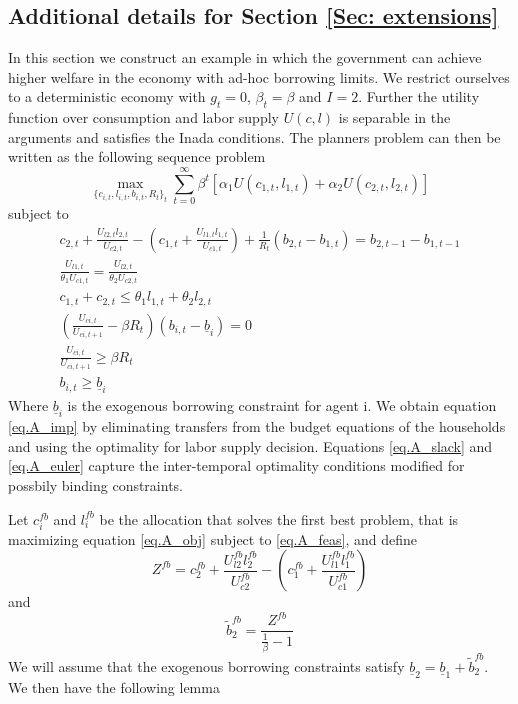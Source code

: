 \documentclass[thmsb,11pt]{article}
\begin{document}
\subsection{Additional details for Section \ref{Sec: extensions}}
\label{appndx: borrowing constraints example}
In this section we construct an example in which the government can achieve
higher welfare in the economy with ad-hoc borrowing limits. We restrict ourselves to a deterministic economy with $g_t=0$, $\beta_t=\beta$ and $I=2$.  Further the utility function over consumption and labor supply $U(c,l)$ is separable in the arguments and satisfies the Inada conditions. The  planners problem can then be written as the following sequence problem
\begin{equation}
	\max_{\{c_{i,t},l_{i,t},b_{i,t},R_t\}_t} \sum_{t=0}^\infty\beta^t\left[\alpha_1U(c_{1,t},l_{1,t}) +\alpha_2 U(c_{2,t},l_{2,t})\right]\label{eq.A_obj}
\end{equation}subject to
\begin{subequations}
\begin{align}
	c_{2,t}+\frac{U_{l2,t}l_{2,t}}{U_{c2,t}}-\left(c_{1,t}+\frac{U_{l1,t}l_{1,t}}{U_{c1,t}}\right) +\frac{1}{R_t}\left( b_{2,t}-b_{1,t}\right)  = b_{2,t-1}-b_{1,t-1}\label{eq.A_imp}\\
	\frac{U_{l1,t}}{\theta_1U_{c1,t}} = \frac{U_{l2,t}}{\theta_2 U_{c2,t}}\label{eq.A_wage}\\
	c_{1,t}+c_{2,t} \leq \theta_1 l_{1,t}+\theta_2 l_{2,t}\label{eq.A_feas}\\
	\left(\frac{U_{ci,t}}{U_{ci,t+1}}-\beta R_t\right)(b_{i,t}-\underline b_i) = 0\label{eq.A_slack}\\
	\frac{U_{ci,t}}{U_{ci,t+1}} \geq \beta R_t\label{eq.A_euler}\\
	b_{i,t}\geq \underline b_i
\end{align}
\end{subequations}  Where $\underline b_i$ is the exogenous borrowing constraint for agent i.  We obtain equation \eqref{eq.A_imp} by eliminating transfers from the budget equations of the households and using the optimality for labor supply decision. Equations \eqref{eq.A_slack} and \eqref{eq.A_euler} capture the inter-temporal optimality conditions modified for possbily binding constraints.

Let $c^{fb}_i$ and $l^{fb}_i$ be the allocation that solves the first best problem, that is maximizing equation \eqref{eq.A_obj} subject to \eqref{eq.A_feas}, and define
\begin{equation}
	Z^{fb}  = c_{2}^{fb}+\frac{U_{l2}^{fb}l_{2}^{fb}}{U_{c2}^{fb}}-\left(c_{1}^{fb}+\frac{U_{l1}^{fb}l_{1}^{fb}}{U_{c1}^{fb}}\right)
\end{equation}and
\begin{equation}
	\tilde b_2^{fb} = \frac{Z^{fb}}{\frac1\beta -1}
\end{equation}  We will assume that the exogenous borrowing constraints satisfy $\underline b_2 = \underline b_1 + \tilde b_2^{fb}$.  We then have the following lemma
\end{document}

